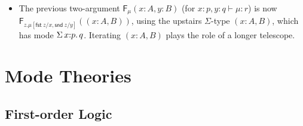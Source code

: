 \documentclass[10pt]{article}
\theoremstyle{definition}
\newcommand\dsd[1]{\ensuremath{\mathsf{#1}}}
\newcommand\F[2]{\ensuremath{\mathsf{F}_{#1}(#2)}}
\newcommand{\app}[2]{\ensuremath{#1 \: #2}}
\newcommand{\sigmacl}[3]{\ensuremath{\textnormal{$\Sigma$}\,#1{:}#2.\,#3}}
\newcommand{\fst}[1]{\app{\dsd{fst}}{#1}}
\newcommand{\snd}[1]{\app{\dsd{snd}}{#1}}
\newcommand{\telety}[3]{\ensuremath{(#1{:}#2,#3)}}
\begin{document}
\begin{itemize}
\item 
The previous two-argument \F{\mu}{x:A,y:B} (for $x :p, y:q \vdash \mu :
r$) is now \F{z.\mu[\fst z/x,\snd z/y]}{\telety{x}{A}{B}}, using the
upstairs $\Sigma$-type ${\telety{x}{A}{B}}$, which has mode
$\sigmacl{x}{p}{q}$.  Iterating $\telety{x}{A}{B}$ plays the role of a
longer telescope.  
\end{itemize}

\section{Mode Theories}

\subsection{First-order Logic}
\end{document}
